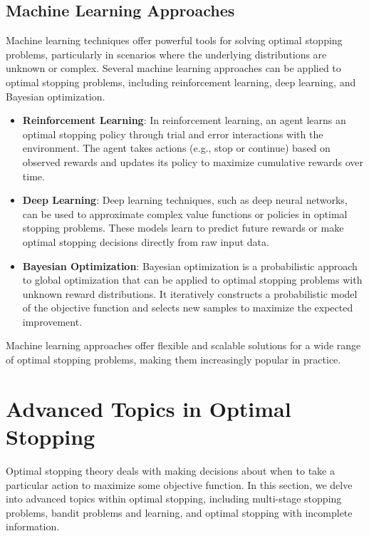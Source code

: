 \documentclass[12pt]{book} %
\begin{document}
\subsection{Machine Learning Approaches}

Machine learning techniques offer powerful tools for solving optimal stopping problems, particularly in scenarios where the underlying distributions are unknown or complex. Several machine learning approaches can be applied to optimal stopping problems, including reinforcement learning, deep learning, and Bayesian optimization.

\begin{itemize}
    \item \textbf{Reinforcement Learning}: In reinforcement learning, an agent learns an optimal stopping policy through trial and error interactions with the environment. The agent takes actions (e.g., stop or continue) based on observed rewards and updates its policy to maximize cumulative rewards over time.
    
    \item \textbf{Deep Learning}: Deep learning techniques, such as deep neural networks, can be used to approximate complex value functions or policies in optimal stopping problems. These models learn to predict future rewards or make optimal stopping decisions directly from raw input data.
    
    \item \textbf{Bayesian Optimization}: Bayesian optimization is a probabilistic approach to global optimization that can be applied to optimal stopping problems with unknown reward distributions. It iteratively constructs a probabilistic model of the objective function and selects new samples to maximize the expected improvement.
\end{itemize}

Machine learning approaches offer flexible and scalable solutions for a wide range of optimal stopping problems, making them increasingly popular in practice.

\section{Advanced Topics in Optimal Stopping}

Optimal stopping theory deals with making decisions about when to take a particular action to maximize some objective function. In this section, we delve into advanced topics within optimal stopping, including multi-stage stopping problems, bandit problems and learning, and optimal stopping with incomplete information.
\end{document}
